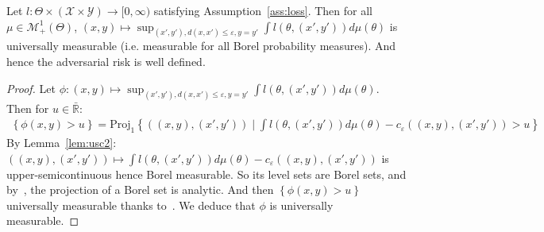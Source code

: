 \begin{lemma}
\label{lem:measure-sup}
Let $l:\Theta\times(\mathcal{X}\times\mathcal{Y})\rightarrow [0,\infty)$ satisfying Assumption~\ref{ass:loss}.
Then for all $\mu\in\mathcal{M}^1_+(\Theta)$, $(x,y)\mapsto \sup_{(x',y'),d(x,x')\leq\varepsilon,y=y'} \int l(\theta,(x',y'))d\mu(\theta)$ is universally measurable (i.e. measurable for all Borel probability measures). And hence the adversarial risk is well defined. 
\end{lemma}
\begin{proof}
Let $\phi :(x,y)\mapsto \sup_{(x',y'),d(x,x')\leq\varepsilon,y=y'} \int l(\theta,(x',y'))d\mu(\theta)$. Then for $u\in\bar{\mathbb{R}}$:
\begin{align*}
\left\{\phi(x,y)>u\right\}=\text{Proj}_1\left\{((x,y),(x',y'))\mid\int l(\theta,(x',y'))d\mu(\theta)-c_\varepsilon((x,y),(x',y'))>u\right\}
\end{align*}
By Lemma~\ref{lem:usc2}: $((x,y),(x',y'))\mapsto \int l(\theta,(x',y'))d\mu(\theta)-c_\varepsilon((x,y),(x',y'))$ is upper-semicontinuous hence Borel measurable. So its level sets are Borel sets, and by~\citep[Proposition 7.39]{bertsekas2004stochastic}, the projection of a Borel set is analytic. And then $\left\{\phi(x,y)>u\right\}$ universally measurable thanks to~\citep[Corollary 7.42.1]{bertsekas2004stochastic}. We deduce that $\phi$ is universally measurable.
\end{proof}



